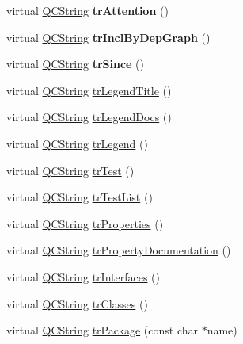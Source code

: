 \begin{DoxyCompactItemize}
virtual \mbox{\hyperlink{class_q_c_string}{Q\+C\+String}} {\bfseries tr\+Attention} ()
\item 
\mbox{\label{class_translator_arabic_a4a917e7aa6aa19176c20496e22fad2bf}} 
virtual \mbox{\hyperlink{class_q_c_string}{Q\+C\+String}} {\bfseries tr\+Incl\+By\+Dep\+Graph} ()
\item 
\mbox{\label{class_translator_arabic_a44d001d5eda86918f053581f5c251972}} 
virtual \mbox{\hyperlink{class_q_c_string}{Q\+C\+String}} {\bfseries tr\+Since} ()
\item 
virtual \mbox{\hyperlink{class_q_c_string}{Q\+C\+String}} \mbox{\hyperlink{class_translator_arabic_a4bbd8643ed28fa15c86fbc8cd38f22f5}{tr\+Legend\+Title}} ()
\item 
virtual \mbox{\hyperlink{class_q_c_string}{Q\+C\+String}} \mbox{\hyperlink{class_translator_arabic_a8e0d765f0f36ce753781268166668e5e}{tr\+Legend\+Docs}} ()
\item 
virtual \mbox{\hyperlink{class_q_c_string}{Q\+C\+String}} \mbox{\hyperlink{class_translator_arabic_abb8560f05098200f708e49b7f379085b}{tr\+Legend}} ()
\item 
virtual \mbox{\hyperlink{class_q_c_string}{Q\+C\+String}} \mbox{\hyperlink{class_translator_arabic_a9f87dd5731ec1d604216233455f439ab}{tr\+Test}} ()
\item 
virtual \mbox{\hyperlink{class_q_c_string}{Q\+C\+String}} \mbox{\hyperlink{class_translator_arabic_a7e8caff2ea908b88b8c90650764fa4d0}{tr\+Test\+List}} ()
\item 
virtual \mbox{\hyperlink{class_q_c_string}{Q\+C\+String}} \mbox{\hyperlink{class_translator_arabic_afbabf4ac8a1961d481c1bf31bcce97ae}{tr\+Properties}} ()
\item 
virtual \mbox{\hyperlink{class_q_c_string}{Q\+C\+String}} \mbox{\hyperlink{class_translator_arabic_ab071310a2ae9e45b495d83fd4eb44f9e}{tr\+Property\+Documentation}} ()
\item 
virtual \mbox{\hyperlink{class_q_c_string}{Q\+C\+String}} \mbox{\hyperlink{class_translator_arabic_a4ecad397cc77436ee6922966d5a2b741}{tr\+Interfaces}} ()
\item 
virtual \mbox{\hyperlink{class_q_c_string}{Q\+C\+String}} \mbox{\hyperlink{class_translator_arabic_afb6f5a575aa2fa43e443a44a1c63f01d}{tr\+Classes}} ()
\item 
virtual \mbox{\hyperlink{class_q_c_string}{Q\+C\+String}} \mbox{\hyperlink{class_translator_arabic_a58878dd256679c4a9a9355d134e15f41}{tr\+Package}} (const char $\ast$name)

\end{DoxyCompactItemize}
